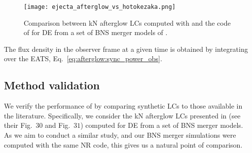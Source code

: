 \begin{figure}[t]
    \centering 
    \texttt{[image: ejecta\_afterglow\_vs\_hotokezaka.png]}
    \caption{
        Comparison between \ac{kN} afterglow \acp{LC} computed with 
        \pyblast{} and the code of \citep{Hotokezaka:2015eja} for \ac{DE}
        from a set of \ac{BNS} merger models of \citep{Radice:2018pdn}. 
    } 
    \label{fig:afg_test}
\end{figure}

%
%

The flux density in the observer frame at a given time 
is obtained by integrating over the \ac{EATS}, 
Eq.~\eqref{eq:afterglow:sync_power_obs}. 





\subsection{Method validation}

We verify the performance of \pyblast{} by comparing synthetic \acp{LC} to 
those available in the literature. Specifically, we consider the \ac{kN} afterglow 
\acp{LC} presented in \citet{Radice:2018pdn} (see their Fig.~$30$ and Fig.~$31$) 
computed for \ac{DE} from a set of \ac{BNS} merger models. As we aim to conduct a 
similar study, and our \ac{BNS} merger simulations were computed with the same 
\ac{NR} code, this gives us a natural point of comparison. 
%


